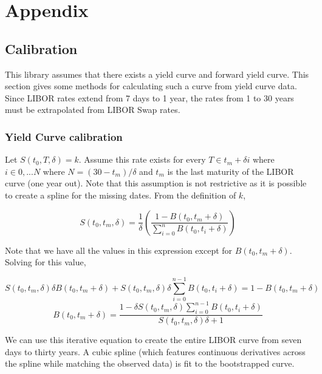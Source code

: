 \documentclass{article}
\theoremstyle{definition}
\begin{document}
\section{Appendix}

\subsection{Calibration}

This library assumes that there exists a yield curve and forward yield curve.  This section gives some methods for calculating such a curve from yield curve data.  Since LIBOR rates extend from 7 days to 1 year, the rates from 1 to 30 years must be extrapolated from LIBOR Swap rates.

\subsubsection{Yield Curve calibration}
Let \(S(t_0, T, \delta)=k\).  Assume this rate exists for every \(T \in t_m+\delta i\) where \(i\in 0,...N\) where \(N=(30-t_m)/ \delta\) and \(t_m\) is the last maturity of the LIBOR curve (one year out).  Note that this assumption is not restrictive as it is possible to create a spline for the missing dates.  From the definition of \(k\),

\[S(t_0, t_m, \delta)=\frac{1}{\delta}\left(\frac{1-B(t_0, t_m+\delta)}{\sum_{i=0}^n B(t_0, t_i+\delta)}\right)\]

Note that we have all the values in this expression except for \(B(t_0, t_m+\delta)\).  Solving for this value,

\[S(t_0, t_m, \delta)\delta B(t_0, t_m+\delta)+ S(t_0, t_m, \delta)\delta\sum_{i=0}^{n-1} B(t_0, t_i+\delta)=1-B(t_0, t_m+\delta)\]
\[B(t_0, t_m+\delta)=\frac{1-\delta S(t_0, t_m, \delta)\sum_{i=0}^{n-1} B(t_0, t_i+\delta)}{S(t_0, t_m, \delta)\delta+1}\]

We can use this iterative equation to create the entire LIBOR curve from seven days to thirty years. A cubic spline (which features continuous derivatives across the spline while matching the observed data) is fit to the bootstrapped curve.
\end{document}
